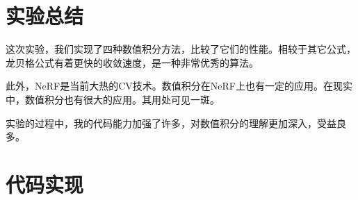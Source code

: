 \documentclass{article}
\begin{document}
\section{实验总结}

这次实验，我们实现了四种数值积分方法，比较了它们的性能。相较于其它公式，龙贝格公式有着更快的收敛速度，是一种非常优秀的算法。

此外，NeRF是当前大热的CV技术。数值积分在NeRF上也有一定的应用。在现实中，数值积分也有很大的应用。其用处可见一斑。

实验的过程中，我的代码能力加强了许多，对数值积分的理解更加深入，受益良多。

\section{代码实现}
\end{document}
